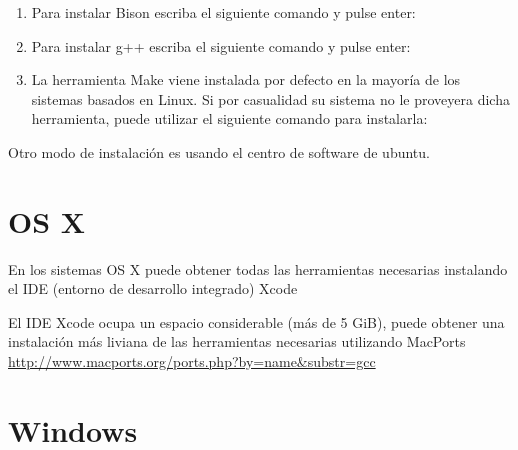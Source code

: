 \begin{enumerate}
		\item Para instalar Bison escriba el siguiente comando y pulse enter:


		\item Para instalar g++ escriba el siguiente comando y pulse enter:


		\item La herramienta Make viene instalada por defecto en la mayoría de los sistemas basados en Linux. Si por casualidad su sistema no le proveyera dicha herramienta, puede utilizar el siguiente comando para instalarla:

	\end{enumerate}

	Otro modo de instalación es usando el centro de software de ubuntu.

\section{OS X}

	En los sistemas OS X puede obtener todas las herramientas necesarias instalando el IDE (entorno de desarrollo integrado) Xcode

	El IDE Xcode ocupa un espacio considerable (más de 5 GiB), puede obtener una instalación más liviana de las herramientas necesarias utilizando MacPorts \url{http://www.macports.org/ports.php?by=name&substr=gcc}

\section{Windows}

